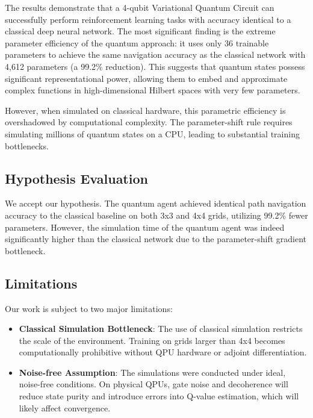 \documentclass[12pt, a4paper]{article}
\begin{document}
The results demonstrate that a 4-qubit Variational Quantum Circuit can successfully perform reinforcement learning tasks with accuracy identical to a classical deep neural network. The most significant finding is the extreme parameter efficiency of the quantum approach: it uses only 36 trainable parameters to achieve the same navigation accuracy as the classical network with 4,612 parameters (a 99.2\% reduction). This suggests that quantum states possess significant representational power, allowing them to embed and approximate complex functions in high-dimensional Hilbert spaces with very few parameters.

However, when simulated on classical hardware, this parametric efficiency is overshadowed by computational complexity. The parameter-shift rule requires simulating millions of quantum states on a CPU, leading to substantial training bottlenecks.

\subsection{Hypothesis Evaluation}

We accept our hypothesis. The quantum agent achieved identical path navigation accuracy to the classical baseline on both 3x3 and 4x4 grids, utilizing 99.2\% fewer parameters. However, the simulation time of the quantum agent was indeed significantly higher than the classical network due to the parameter-shift gradient bottleneck.

\subsection{Limitations}

Our work is subject to two major limitations:
\begin{itemize}
    \item \textbf{Classical Simulation Bottleneck}: The use of classical simulation restricts the scale of the environment. Training on grids larger than 4x4 becomes computationally prohibitive without QPU hardware or adjoint differentiation.
    \item \textbf{Noise-free Assumption}: The simulations were conducted under ideal, noise-free conditions. On physical QPUs, gate noise and decoherence will reduce state purity and introduce errors into Q-value estimation, which will likely affect convergence.
\end{itemize}

\newpage
\end{document}
